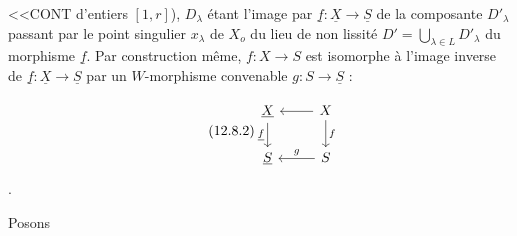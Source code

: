 
<<CONT d'entiers $[1,r]$), $D_\lambda$ étant l'image par $\underline{f} : \underline{X} \longrightarrow \underline{S}$ de la composante $D'_\lambda$ passant par le point singulier $x_\lambda$ de $X_o$ du lieu de non lissité $D' = \bigcup_{\lambda \in L} D'_\lambda$ du morphisme $\underline{f}$. Par construction même, $f : X \longrightarrow S$ est isomorphe à l'image inverse de $\underline{f} : \underline{X} \longrightarrow \underline{S}$ par un $W$-morphisme convenable $g : S \longrightarrow \underline{S}$ :

\begin{equation}\tag{12.8.2}
\begin{tikzcd}
\underline{X} \arrow[d, "\underline{f}"'] & X \arrow[l] \arrow[d, "f"] \\
\underline{S} & S \arrow[l, "g"']
\end{tikzcd}
\end{equation}
.

Posons

